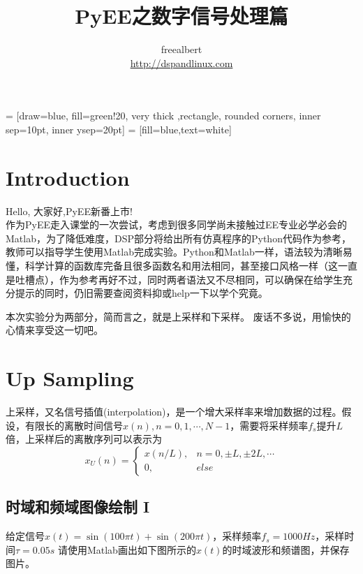 \documentclass{article}
\begin{document}
 = [draw=blue, fill=green!20, very thick ,rectangle, rounded corners, inner sep=10pt, inner ysep=20pt]
 = [fill=blue,text=white]
{\setmainfont{FZShouJinShu-S10}
\title{{\setmainfont{FZShouJinShu-S10}\bf{PyEE之数字信号处理篇}}}
\author{freealbert\\\href{http://dspandlinux.com}{http://dspandlinux.com}}
\maketitle
}
\section{Introduction}

Hello, 大家好,PyEE新番上市!\\

作为PyEE走入课堂的一次尝试，考虑到很多同学尚未接触过EE专业必学必会的Matlab，为了降低难度，DSP部分将给出所有仿真程序的Python代码作为参考，教师可以指导学生使用Matlab完成实验。Python和Matlab一样，语法较为清晰易懂，科学计算的函数库完备且很多函数名和用法相同，甚至接口风格一样（这一直是吐槽点），作为参考再好不过，同时两者语法又不尽相同，可以确保在给学生充分提示的同时，仍旧需要查阅资料抑或help一下以学个究竟。

本次实验分为两部分，简而言之，就是上采样和下采样。
废话不多说，用愉快的心情来享受这一切吧。
\section{Up Sampling}
上采样，又名信号插值(interpolation)，是一个增大采样率来增加数据的过程。假设，有限长的离散时间信号$x(n),n=0,1,\cdots,N-1$，需要将采样频率$f_s$提升$L$倍，上采样后的离散序列可以表示为
\begin{equation}
	x_U(n)=\left\{
	\begin{array}{ll}
		x(n/L), & n=0,\pm L,\pm 2L,\cdots\\
		0, & else
	\end{array}\right.
\end{equation}
\subsection{时域和频域图像绘制 I}
给定信号$x(t)=\sin(100\pi t)+\sin(200\pi t)$，采样频率$f_s=1000Hz$，采样时间$\tau=0.05s$
请使用Matlab画出如下图所示的$x(t)$的时域波形和频谱图，并保存图片。\\
{\small \setmainfont{AR PL UKai CN}{
Tips: 对于如何画图有疑问时，最好的方法就是在Matlab的Command Window中输入 help yourFunction ，yourFunction指你需要查询的函数，你大体需要以下函数 stem,plot,fft,fftshift}}
\end{document}
